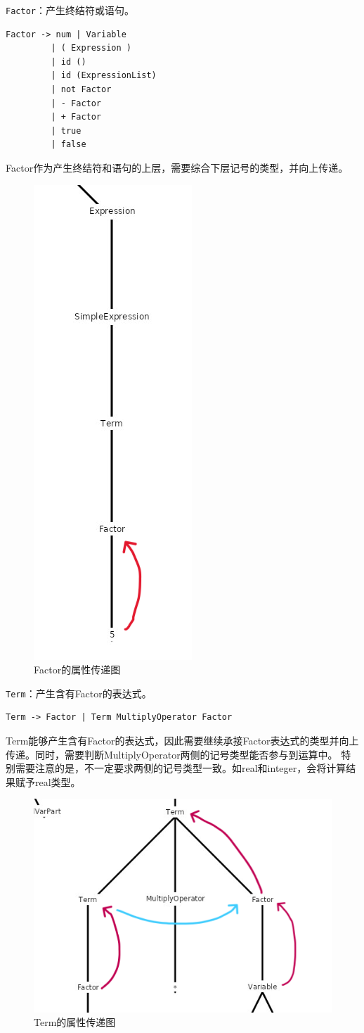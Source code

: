 \documentclass[../main.tex]{subfiles}
\begin{document}
\texttt{Factor}：产生终结符或语句。

\begin{lstlisting}[style=grammar]
Factor -> num | Variable
         | ( Expression )
         | id ()
         | id (ExpressionList)
         | not Factor
         | - Factor
         | + Factor
         | true
         | false
\end{lstlisting}
        
Factor作为产生终结符和语句的上层，需要综合下层记号的类型，并向上传递。

\begin{figure}[h]
\centering
\includegraphics[width=0.2\linewidth ]{assets/类型检查/Factor.png}
\caption{Factor的属性传递图}
\label{fig:Factor}
\end{figure}

\texttt{Term}：产生含有Factor的表达式。

\begin{lstlisting}[style=grammar]
Term -> Factor | Term MultiplyOperator Factor
\end{lstlisting}

Term能够产生含有Factor的表达式，因此需要继续承接Factor表达式的类型并向上传递。同时，需要判断MultiplyOperator两侧的记号类型能否参与到运算中。
特别需要注意的是，不一定要求两侧的记号类型一致。如real和integer，会将计算结果赋予real类型。

\begin{figure}[h]
\centering
\includegraphics[width=0.5\linewidth ]{assets/类型检查/Term.png}
\caption{Term的属性传递图}
\label{fig:Term}
\end{figure}
\end{document}
